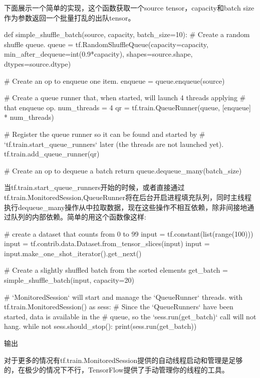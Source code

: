 下面展示一个简单的实现，这个函数获取一个source tensor，capacity和batch size作为参数返回一个批量打乱的出队tensor。
\begin{python}
def simple_shuffle_batch(source, capacity, batch_size=10):
  # Create a random shuffle queue.
    queue = tf.RandomShuffleQueue(capacity=capacity,
                                  min_after_dequeue=int(0.9*capacity),
                                  shapes=source.shape, dtypes=source.dtype)

    # Create an op to enqueue one item.
    enqueue = queue.enqueue(source)

    # Create a queue runner that, when started, will launch 4 threads applying
    # that enqueue op.
    num_threads = 4
    qr = tf.train.QueueRunner(queue, [enqueue] * num_threads)

    # Register the queue runner so it can be found and started by
    # `tf.train.start\_queue\_runners` later (the threads are not launched yet).
    tf.train.add_queue_runner(qr)

    # Create an op to dequeue a batch
    return queue.dequeue_many(batch_size)
\end{python}
当tf.train.start\_queue\_runners开始的时候，或者直接通过tf.train.MonitoredSession,QueueRunner将在后台开启进程填充队列，同时主线程执行dequeue\_many操作从中拉取数据，现在这些操作不相互依赖，除非间接地通过队列的内部依赖。简单的用这个函数像这样:
\begin{python}
# create a dataset that counts from 0 to 99
input = tf.constant(list(range(100)))
input = tf.contrib.data.Dataset.from_tensor_slices(input)
input = input.make_one_shot_iterator().get_next()

# Create a slightly shuffled batch from the sorted elements
get_batch = simple_shuffle_batch(input, capacity=20)

# `MonitoredSession` will start and manage the `QueueRunner` threads.
with tf.train.MonitoredSession() as sess:
    # Since the `QueueRunners` have been started, data is available in the
    # queue, so the `sess.run(get\_batch)` call will not hang.
    while not sess.should_stop():
        print(sess.run(get_batch))
\end{python}
输出
\begin{python}
[ 8 10  7  5  4 13 15 14 25  0]
[23 29 28 31 33 18 19 11 34 27]
[12 21 37 39 35 22 44 36 20 46]
\end{python}
对于更多的情况有tf.train.MonitoredSession提供的自动线程启动和管理是足够的，在极少的情况下不行，TensorFlow提供了手动管理你的线程的工具。

